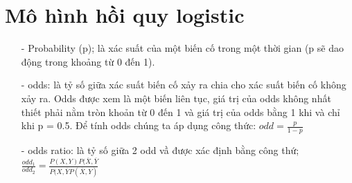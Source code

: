 \documentclass{report}
\begin{document}
    \section{Mô hình hồi quy logistic}
    \fontsize{13}{10}\selectfont
    \begin{enumerate}
        \item [- ] Probability (p); là xác suất của một biến cố trong một thời gian (p sẽ dao động trong khoảng từ 0 đến 1).
        \item [- ] odds: là tỷ số giữa xác suất biến cố xảy ra chia cho xác suất biến cố không xảy ra. Odds được xem là một biến liên tục, giá trị của odds không nhất thiết phải nằm tròn khoản từ 0 đến 1 và giá trị của odds bằng 1 khi và chỉ khi p = 0.5. Để tính odds chúng ta áp dụng công thức: $odd = \frac{p}{1 - p}$ 
                
        \pagebreak
        
        \item [- ] odds ratio: là tỷ số giữa 2 odd vầ được xác định bằng công thứ; $ \frac{odd_1}{odd_2} = \frac{P(X,Y)P(\overline{X},\overline{Y}}{P(X,\overline{Y}P(\overline{X},Y)}$


\end{enumerate}
\end{document}
